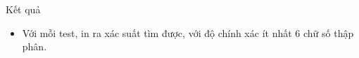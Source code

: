 Kết quả  
\begin{itemize}
	\item     Với mỗi test, in ra xác suất tìm được, với độ chính xác ít nhất 6 chữ số thập phân.   
\end{itemize}